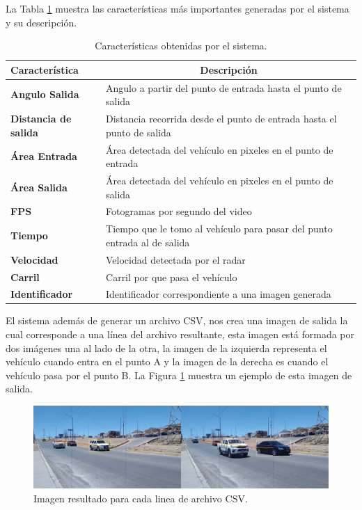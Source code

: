 La Tabla \ref{tab:CaracteristicasSistema} muestra las características más importantes generadas por el sistema y su descripción.

\begin{table}[H]
    \caption{Características obtenidas por el sistema.}
    \label{tab:CaracteristicasSistema}
    \begin{tabular}{|l|l|}
        \hline
        \textbf{Característica} & \multicolumn{1}{c|}{\textbf{Descripción}} \\ \hline
        \textbf{Angulo Salida} & Angulo a partir del punto de entrada hasta el punto de salida \\ \hline
        \textbf{Distancia de salida} & Distancia recorrida desde el punto de entrada hasta el punto de salida \\ \hline
        \textbf{Área Entrada} & Área detectada del vehículo en pixeles en el punto de entrada \\ \hline
        \textbf{Área Salida} & Área detectada del vehículo en pixeles en el punto de salida \\ \hline
        \textbf{FPS} & Fotogramas por segundo del video \\ \hline
        \textbf{Tiempo} & Tiempo que le tomo al vehículo para pasar del punto entrada al de salida \\ \hline
        \textbf{Velocidad} & Velocidad detectada por el radar \\ \hline
        \textbf{Carril} & Carril por que pasa el vehículo \\ \hline
        \textbf{Identificador} & Identificador correspondiente a una imagen generada \\ \hline
    \end{tabular}
\end{table}


El sistema además de generar un archivo CSV, nos crea una imagen de salida la cual corresponde a una línea del archivo resultante, esta imagen está formada por dos imágenes una al lado de la otra, la imagen de la izquierda representa el vehículo cuando entra en el punto A y la imagen de la derecha es cuando el vehículo pasa por el punto B. La Figura \ref{fig:Completo} muestra un ejemplo de esta imagen de salida.

\begin{figure}[H]
    \centering
    \includegraphics[width=1\textwidth]{Metodologia/imgs/Completo.jpg}
    \caption{Imagen resultado para cada linea de archivo CSV.}
    \label{fig:Completo}
\end{figure}

